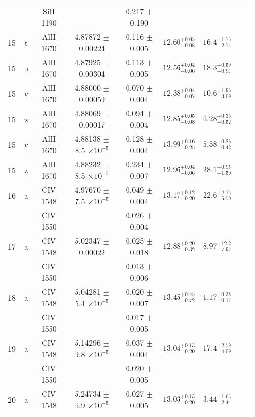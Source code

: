 \documentclass[12pt]{article}
\begin{document}
\begin{footnotesize}
\begin{longtable}{ c c c c c c c c c}
  &   & SiII     1190  &  &  0.217 $\pm$ 0.190   &   &     & 	 & \\ 
      15  & t  & AlII     1670  &  4.87872 $\pm$ 0.00224  &  0.116 $\pm$ 0.005   & $12.60_{ - 0.08}^{ + 0.05}$  & $16.4_{ - 2.74}^{ + 1.75}$    & 	 & \\ 
      15  & u  & AlII     1670  &  4.87925 $\pm$ 0.00304  &  0.113 $\pm$ 0.005   & $12.56_{ - 0.06}^{ + 0.04}$  & $18.3_{ - 0.91}^{ + 0.59}$    & 	 & \\ 
      15  & v  & AlII     1670  &  4.88000 $\pm$ 0.00059  &  0.070 $\pm$ 0.004   & $12.38_{ - 0.07}^{ + 0.04}$  & $10.6_{ - 3.09}^{ + 1.96}$    & 	 & \\ 
      15  & w  & AlII     1670  &  4.88069 $\pm$ 0.00017  &  0.094 $\pm$ 0.004   & $12.85_{ - 0.08}^{ + 0.05}$  & $6.28_{ - 0.52}^{ + 0.33}$    & 	 & \\ 
      15  & y  & AlII     1670  &  4.88138 $\pm$ 8.5 $\times 10^{-5}$   &  0.128 $\pm$ 0.004   & $13.99_{ - 0.25}^{ + 0.16}$  & $5.58_{ - 0.42}^{ + 0.26}$    & 	 & \\ 
      15  & z  & AlII     1670  &  4.88232 $\pm$ 8.5 $\times 10^{-5}$   &  0.234 $\pm$ 0.007   & $12.96_{ - 0.06}^{ + 0.04}$  & $28.1_{ - 1.50}^{ + 0.95}$    & 	 & \\ 
      16  & a  & CIV     1548  &  4.97670 $\pm$ 7.5 $\times 10^{-5}$   &  0.049 $\pm$ 0.004   & $13.17_{ - 0.20}^{ + 0.12}$  & $22.6_{ - 6.50}^{ + 4.13}$    & 	 & \\ 
  &   & CIV     1550  &  &  0.026 $\pm$ 0.004   &   &     & 	 & \\ 
      17  & a  & CIV     1548  &  5.02347 $\pm$ 0.00022  &  0.025 $\pm$ 0.018   & $12.88_{ - 0.32}^{ + 0.20}$  & $8.97_{ - 7.97}^{ + 12.2}$    & 	 & \\ 
  &   & CIV     1550  &  &  0.013 $\pm$ 0.006   &   &     & 	 & \\ 
      18  & a  & CIV     1548  &  5.04281 $\pm$ 5.4 $\times 10^{-5}$   &  0.020 $\pm$ 0.007   & $13.45_{ - 0.72}^{ + 0.45}$  & $1.17_{ - 0.17}^{ + 0.38}$    & 	 & \\ 
  &   & CIV     1550  &  &  0.017 $\pm$ 0.005   &   &     & 	 & \\ 
      19  & a  & CIV     1548  &  5.14296 $\pm$ 9.8 $\times 10^{-5}$   &  0.037 $\pm$ 0.004   & $13.04_{ - 0.20}^{ + 0.13}$  & $17.4_{ - 4.09}^{ + 2.59}$    & 	 & \\ 
  &   & CIV     1550  &  &  0.020 $\pm$ 0.005   &   &     & 	 & \\ 
      20  & a  & CIV     1548  &  5.24734 $\pm$ 6.9 $\times 10^{-5}$   &  0.027 $\pm$ 0.005   & $13.03_{ - 0.20}^{ + 0.13}$  & $3.44_{ - 2.44}^{ + 1.63}$    & 	 & \\ 

\end{longtable}
\end{footnotesize}
\end{document}
